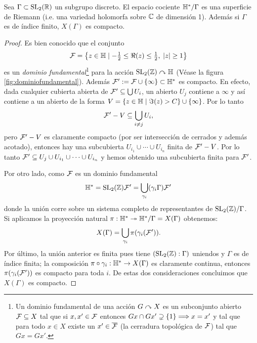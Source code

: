 \begin{thm}\label{thm:curvamodularcompacta}
  Sea $\Gamma\subset\mathrm{SL}_2(\mathbb{R})$ un subgrupo discreto. El espacio cociente $\mathbb{H}^*/\Gamma$ es una
  superficie de Riemann (i.e. una variedad holomorfa sobre $\mathbb{C}$ de dimensi\'on 1). Adem\'as si
  $\Gamma$ es de \'indice finito, $X(\Gamma)$ es compacto.
\end{thm}

\begin{proof}%
  Es bien conocido que el conjunto
  \[
    \mathcal{F}=
    \left\{z\in\mathbb{H}\mid -\tfrac{1}{2}\leq\Re(z)\leq\tfrac{1}{2},\;\left| z \right|\geq1\right\}
  \]
  es un \emph{dominio fundamental}\footnote{Un dominio fundamental de una acci\'on $G\curvearrowright X$ es un
    subconjunto abierto $\mathcal{F}\subseteq X$ tal que si $x,x'\in\mathcal{F}$ entonces $Gx\cap Gx'\supsetneq\{1\}\Longrightarrow x=x'$
    y tal que para todo $x\in X$ existe un $x'\in\overline{\mathcal{F}}$ (la cerradura topol\'ogica de $\mathcal{F}$) tal
    que $Gx=Gx'$.}
  para la acci\'on $\mathrm{SL}_2(\mathbb{Z})\curvearrowright\mathbb{H}$ (V\'ease la figura \ref{fig:dominiofundamental}). Adem\'as
  $\mathcal{F}':=\mathcal{F}\cup\{\infty\}\subset\mathbb{H}^*$ es compacto. En efecto, dada cualquier cubierta abierta
  de $\mathcal{F}'\subseteq\bigcup U_i$, un abierto $U_j$ contiene a $\infty$ y as\'i contiene a un
  abierto de la forma $V=\{z\in\mathbb{H}\mid \Im(z)>C\}\cup\{\infty\}$. Por lo tanto
  \[
    \mathcal{F}'-V\subseteq\bigcup_{i\neq j} U_i,
  \]
  pero $\mathcal{F}'-V$ es claramente compacto (por ser intersecci\'on de cerrados y adem\'as acotado),
  entonces hay una subcubierta $U_{i_1}\cup\cdots\cup U_{i_n}$ finita de $\mathcal{F}'-V$. Por lo tanto
  $\mathcal{F}'\subseteq U_j\cup U_{i_1}\cup\cdots\cup U_{i_n}$ y hemos obtenido una subcubierta finita para
  $\mathcal{F}'$.

  Por otro lado, como $\mathcal{F}$ es un dominio fundamental
  \[
    \mathbb{H}^*=\mathrm{SL}_2(\mathbb{Z})\mathcal{F}'=\bigcup_{\gamma_i}(\gamma_i\Gamma) \mathcal{F}'
  \]
  donde la uni\'on corre sobre un sistema completo de representantes de $\mathrm{SL}_2(\mathbb{Z})/\Gamma$. Si
  aplicamos la proyecci\'on natural $\pi:\mathbb{H}^*\twoheadrightarrow \mathbb{H}^*/\Gamma=X(\Gamma)$ obtenemos:
  \[
    X(\Gamma)=\bigcup_{\gamma_i}\pi(\gamma_i(\mathcal{F}')).
  \]
  Por \'ultimo, la uni\'on anterior es finita pues tiene $(\mathrm{SL}_2(\mathbb{Z}):\Gamma)$ uniendos y $\Gamma$
  es de \'indice finita; la composici\'on $\pi\circ\gamma_i:\mathbb{H}^*\rightarrow X(\Gamma)$ es claramente
  continua, entonces $\pi(\gamma_i(\mathcal{F}'))$ es compacto para toda $i$. De estas dos consideraciones
  concluimos que $X(\Gamma)$ es compacto.
\end{proof}
